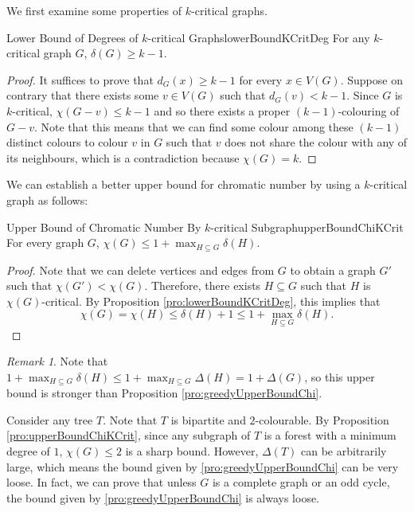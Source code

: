 \documentclass[math]{amznotes}
\theoremstyle{remark}
\newtheorem*{remark}{Remark}
\newcommand{\0}{\mathbf{0}}
\newcommand{\1}{\mathbf{1}}
\begin{document}
We first examine some properties of $k$-critical graphs.
\begin{probox}{Lower Bound of Degrees of $k$-critical Graphs}{lowerBoundKCritDeg}
    For any $k$-critical graph $G$, $\delta(G) \geq k - 1$.
    \tcblower
    \begin{proof}
        It suffices to prove that $d_G(x) \geq k - 1$ for every $x \in V(G)$. Suppose on contrary that there exists some $v \in V(G)$ such that $d_G(v) < k - 1$. Since $G$ is $k$-critical, $\chi(G - v) \leq k - 1$ and so there exists a proper $(k - 1)$-colouring of $G - v$. Note that this means that we can find some colour among these $(k - 1)$ distinct colours to colour $v$ in $G$ such that $v$ does not share the colour with any of its neighbours, which is a contradiction because $\chi(G) = k$.
    \end{proof}
\end{probox}
We can establish a better upper bound for chromatic number by using a $k$-critical graph as follows:
\begin{probox}{Upper Bound of Chromatic Number By $k$-critical Subgraph}{upperBoundChiKCrit}
    For every graph $G$, $\chi(G) \leq 1 + \max_{H \subseteq G}\delta(H)$.
    \tcblower
    \begin{proof}
        Note that we can delete vertices and edges from $G$ to obtain a graph $G'$ such that $\chi(G') < \chi(G)$. Therefore, there exists $H \subseteq G$ such that $H$ is $\chi(G)$-critical. By Proposition \ref{pro:lowerBoundKCritDeg}, this implies that
        \begin{equation*}
            \chi(G) = \chi(H) \leq \delta(H) + 1 \leq 1 + \max_{H \subseteq G}\delta(H).
        \end{equation*}
    \end{proof}
\end{probox}
\begin{notebox}
    \begin{remark}
        Note that $1 + \max_{H \subseteq G}\delta(H) \leq 1 + \max_{H \subseteq G}\Delta(H) = 1 + \Delta(G)$, so this upper bound is stronger than Proposition \ref{pro:greedyUpperBoundChi}.
    \end{remark}
\end{notebox}
Consider any tree $T$. Note that $T$ is bipartite and $2$-colourable. By Proposition \ref{pro:upperBoundChiKCrit}, since any subgraph of $T$ is a forest with a minimum degree of $1$, $\chi(G) \leq 2$ is a sharp bound. However, $\Delta(T)$ can be arbitrarily large, which means the bound given by \ref{pro:greedyUpperBoundChi} can be very loose. In fact, we can prove that unless $G$ is a complete graph or an odd cycle, the bound given by \ref{pro:greedyUpperBoundChi} is always loose.
\end{document}
